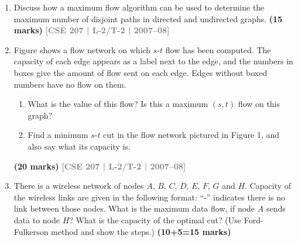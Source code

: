 \documentclass[12pt]{article}
\newcommand{\yr}[1]{\hfill\textcolor{gray}{\small\textbf{[#1]}}}
\newcommand{\mk}[1]{\textcolor{orange!70!black}{\small\textbf{(#1 marks)}}}
\begin{document}
\begin{enumerate}
\item Discuss how a maximum flow algorithm can be used to determine the maximum number of disjoint paths in directed and undirected graphs. \mk{15}
\yr{CSE 207 | L-2/T-2 | 2007--08}


\item Figure shows a flow network on which $s$-$t$ flow has been computed. The capacity of each edge appears as a label next to the edge, and the numbers in boxes give the amount of flow sent on each edge. Edges without boxed numbers have no flow on them.
\begin{enumerate}
  \item What is the value of this flow? Is this a maximum $(s, t)$ flow on this graph?
  \item Find a minimum $s$-$t$ cut in the flow network pictured in Figure 1, and also say what its capacity is.
\end{enumerate}

\begin{center}

\end{center}
 \mk{20} \yr{CSE 207 | L-2/T-2 | 2007--08}


\item There is a wireless network of nodes $A$, $B$, $C$, $D$, $E$, $F$, $G$ and $H$. Capacity of the wireless links are given in the following format: ``-'' indicates there is no link between those nodes. What is the maximum data flow, if node $A$ sends data to node $H$? What is the capacity of the optimal cut? (Use Ford-Fulkerson method and show the steps.) \mk{10+5=15}


\end{enumerate}
\end{document}
